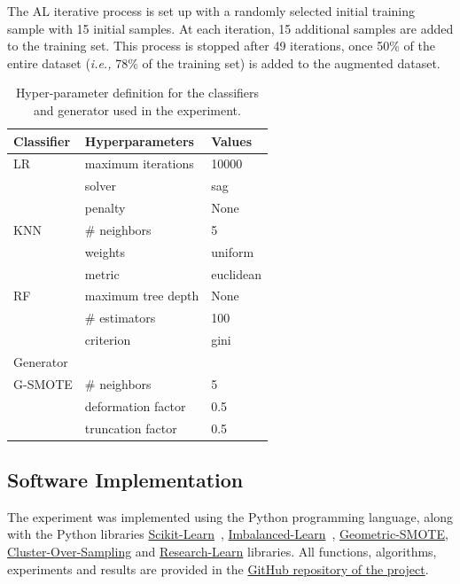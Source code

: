 \documentclass[preprint,12pt]{elsarticle}
\begin{document}
The AL iterative process is set up with a randomly selected initial training
sample with 15 initial samples. At each iteration, 15 additional samples are
added to the training set. This process is stopped after 49 iterations, once
50\% of the entire dataset (\textit{i.e.,} 78\% of the training set) is added
to the augmented dataset.

\begin{table}[H]
	\centering
	\begin{tabular}{lll}
		\toprule
		Classifier & Hyperparameters      & Values             \\
		\midrule
		LR         & maximum iterations   & 10000              \\
		           & solver               & sag                \\
                   & penalty              & None               \\
		KNN        & \# neighbors         & 5                  \\
                   & weights              & uniform            \\
                   & metric               & euclidean          \\
		RF         & maximum tree depth   & None               \\
		           & \# estimators        & 100                \\
                   & criterion            & gini               \\
		\toprule
		Generator  &                      &                    \\
		\midrule
		G-SMOTE    & \# neighbors         & 5                  \\
                   & deformation factor   & 0.5                \\
                   & truncation factor    & 0.5                \\
		\bottomrule
	\end{tabular}
    \caption{\label{tab:grid}Hyper-parameter definition for the classifiers and
    generator used in the experiment.}
\end{table}

\subsection{Software Implementation}

The experiment was implemented using the Python programming language, along
with the Python libraries
\href{https://scikit-learn.org/stable/}{Scikit-Learn}~\cite{Pedregosa2011},
\href{https://imbalanced-learn.org/en/stable/}{Imbalanced-Learn}~\cite{JMLR:v18:16-365},
\href{https://geometric-smote.readthedocs.io/en/latest/?badge=latest}{Geometric-SMOTE},
\href{https://cluster-over-sampling.readthedocs.io/en/latest/?badge=latest}{Cluster-Over-Sampling}
and
\href{https://research-learn.readthedocs.io/en/latest/?badge=latest}{Research-Learn}
libraries. All functions, algorithms, experiments and results are provided in
the \href{https://github.com/joaopfonseca/research/}{GitHub repository of the
project}.
\end{document}
